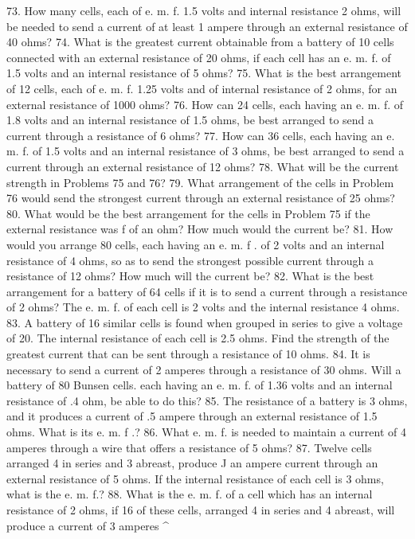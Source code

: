 73. How many cells, each of e. m. f. 1.5 volts and internal resistance 2 ohms, will be needed to send a current of at least 1 ampere through an external resistance of 40 ohms?
74. What is the greatest current obtainable from a battery of 10 cells connected with an external resistance of 20 ohms, if each cell has an e. m. f. of 1.5 volts and an internal resistance of 5 ohms?
75. What is the best arrangement of 12 cells, each of e. m. f. 1.25 volts and of internal resistance of 2 ohms, for an external resistance of 1000 ohms?
76. How can 24 cells, each having an e. m. f. of 1.8 volts and an internal resistance of 1.5 ohms, be best arranged to send a current through a resistance of 6 ohms?
77. How can 36 cells, each having an e. m. f. of 1.5 volts and an internal resistance of 3 ohms, be best arranged to send a current through an external resistance of 12 ohms?
78. What will be the current strength in Problems 75 and 76?
79. What arrangement of the cells in Problem 76 would send the strongest current through an external resistance of 25 ohms?
80. What would be the best arrangement for the cells in Problem 75 if the external resistance was f of an ohm? How much would the current be?
81. How would you arrange 80 cells, each having an e. m. f . of 2 volts and an internal resistance of 4 ohms, so as to send the strongest possible current through a resistance of 12 ohms? How much will the current be?
82. What is the best arrangement for a battery of 64 cells if it is to send a current through a resistance of 2 ohms? The e. m. f. of each cell is 2 volts and the internal resistance 4 ohms.
83. A battery of 16 similar cells is found when grouped in series to give a voltage of 20. The internal resistance of each cell is 2.5 ohms. Find the strength of the greatest current that can be sent through a resistance of 10 ohms.
84. It is necessary to send a current of 2 amperes through a resistance of 30 ohms. Will a battery of 80 Bunsen cells. each having an e. m. f. of 1.36 volts and an internal resistance of .4 ohm, be able to do this?
85. The resistance of a battery is 3 ohms, and it produces a current of .5 ampere through an external resistance of 1.5 ohms. What is its e. m. f .?
86. What e. m. f. is needed to maintain a current of 4 amperes through a wire that offers a resistance of 5 ohms?
87. Twelve cells arranged 4 in series and 3 abreast, produce J an ampere current through an external resistance of 5 ohms. If the internal resistance of each cell is 3 ohms, what is the e. m. f.?
88. What is the e. m. f. of a cell which has an internal resistance of 2 ohms, if 16 of these cells, arranged 4 in series and 4 abreast, will produce a current of 3 amperes ^
